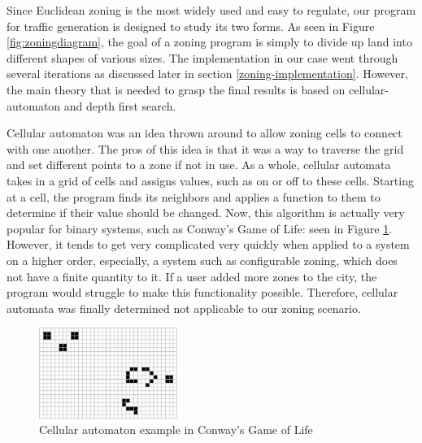 \documentclass[11pt]{article}
\begin{document}
\begin{multicols}{2}
    \quad Since Euclidean zoning is the most widely used and easy to regulate, our program for traffic generation is designed to study its two forms. As seen in Figure \ref{fig:zoningdiagram}, the goal of a zoning program is simply to divide up land into different shapes of various sizes. The implementation in our case went through several iterations as discussed later in section \ref{zoning-implementation}. However, the main theory that is needed to grasp the final results is based on cellular-automaton and depth first search. 

    \quad Cellular automaton was an idea thrown around to allow zoning cells to connect with one another. The pros of this idea is that it was a way to traverse the grid and set different points to a zone if not in use. As a whole, cellular automata takes in a grid of cells and assigns values, such as on or off to these cells. Starting at a cell, the program finds its neighbors and applies a function to them to determine if their value should be changed. Now, this algorithm is actually very popular for binary systems, such as Conway's Game of Life: seen in Figure \ref{fig:cellular-automaton}. However, it tends to get very complicated very quickly when applied to a system on a higher order, especially, a system such as configurable zoning, which does not have a finite quantity to it. If a user added more zones to the city, the program would struggle to make this functionality possible. Therefore, cellular automata was finally determined not applicable to our zoning scenario.\\

    \begin{figure}[H]
        \centering
        \includegraphics[width=0.4\textwidth]{images/cellularautomaton.png}
        \caption{Cellular automaton example in Conway's Game of Life \cite{cellularautomaton}}
        \label{fig:cellular-automaton}
    \end{figure}


\end{multicols}
\end{document}
